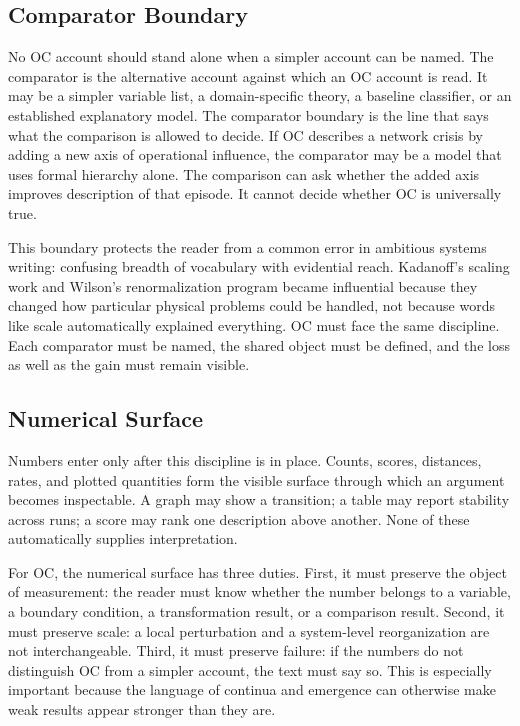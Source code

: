 \documentclass[11pt,a4paper,openany]{book}
\begin{document}
\subsection{Comparator Boundary}
No OC account should stand alone when a simpler account can be named. The comparator is the alternative account against which an OC account is read. It may be a simpler variable list, a domain-specific theory, a baseline classifier, or an established explanatory model. The comparator boundary is the line that says what the comparison is allowed to decide. If OC describes a network crisis by adding a new axis of operational influence, the comparator may be a model that uses formal hierarchy alone. The comparison can ask whether the added axis improves description of that episode. It cannot decide whether OC is universally true. \cite{goldenfeld_lectures,kadanoff_scaling}\par
This boundary protects the reader from a common error in ambitious systems writing: confusing breadth of vocabulary with evidential reach. Kadanoff's scaling work and Wilson's renormalization program became influential because they changed how particular physical problems could be handled, not because words like scale automatically explained everything. OC must face the same discipline. Each comparator must be named, the shared object must be defined, and the loss as well as the gain must remain visible.\par
\subsection{Numerical Surface}
Numbers enter only after this discipline is in place. Counts, scores, distances, rates, and plotted quantities form the visible surface through which an argument becomes inspectable. A graph may show a transition; a table may report stability across runs; a score may rank one description above another. None of these automatically supplies interpretation. \cite{goldenfeld_lectures,kadanoff_scaling}\par
For OC, the numerical surface has three duties. First, it must preserve the object of measurement: the reader must know whether the number belongs to a variable, a boundary condition, a transformation result, or a comparison result. Second, it must preserve scale: a local perturbation and a system-level reorganization are not interchangeable. Third, it must preserve failure: if the numbers do not distinguish OC from a simpler account, the text must say so. This is especially important because the language of continua and emergence can otherwise make weak results appear stronger than they are.\par
\end{document}
